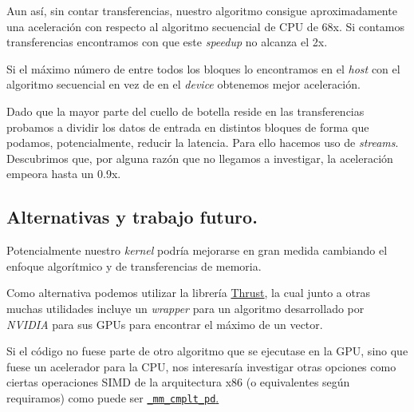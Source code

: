Aun así, sin contar transferencias, nuestro algoritmo consigue aproximadamente una aceleración con respecto al algoritmo secuencial de CPU
de 68x. Si contamos transferencias encontramos con que este \textit{speedup} no alcanza el 2x.

Si el máximo número de entre todos los bloques lo encontramos en el \textit{host} con el algoritmo secuencial en vez de en el \textit{device}
obtenemos mejor aceleración.

Dado que la mayor parte del cuello de botella reside en las transferencias probamos a dividir los datos de entrada en distintos
bloques de forma que podamos, potencialmente, reducir la latencia. Para ello hacemos uso de \textit{streams}.
Descubrimos que, por alguna razón que no llegamos a investigar, la aceleración empeora hasta un 0.9x.

\subsection{Alternativas y trabajo futuro.}

Potencialmente nuestro \textit{kernel} podría mejorarse en gran medida cambiando el enfoque algorítmico y de transferencias de memoria.

Como alternativa podemos utilizar la librería \href{https://github.com/NVIDIA/thrust}{Thrust}, la cual junto a otras muchas utilidades
incluye un \textit{wrapper} para un algoritmo desarrollado por \textit{NVIDIA} para sus GPUs para encontrar el máximo de un vector.

Si el código no fuese parte de otro algoritmo que se ejecutase en la GPU, sino que fuese un acelerador para la CPU, nos interesaría investigar
otras opciones como ciertas operaciones SIMD de la arquitectura x86 (o equivalentes según requiramos) como puede ser
\href{https://www.intel.com/content/www/us/en/docs/intrinsics-guide/index.html#text=_mm_cmplt_pd&ig_expand=1173}{\texttt{\_mm\_cmplt\_pd}.}
